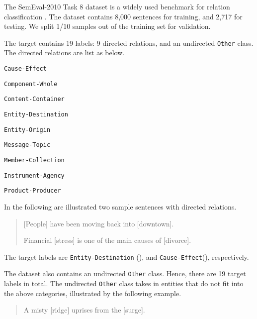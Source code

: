 \documentclass[11pt,a4paper]{article}
\begin{document}
The SemEval-2010 Task 8 dataset is a widely used benchmark for
relation classification \cite{2010SVM}. The dataset contains 8,000 sentences for training, and 2,717 for testing.
We split 1/10 samples out of the training set for validation.

The target contains 19 labels: 9 directed relations, and an undirected \verb|Other| class.
The directed relations are list as below.


\smallskip
\begin{compactitem}
\item \verb|Cause-Effect|

\item \verb|Component-Whole|

\item \verb|Content-Container|

\item \verb|Entity-Destination|

\item \verb|Entity-Origin|

\item \verb|Message-Topic|

\item \verb|Member-Collection|

\item \verb|Instrument-Agency|

\item \verb|Product-Producer|
\end{compactitem}

\smallskip
In the following are illustrated two sample sentences with directed relations.

\begin{quote}
[People] have been moving back into [downtown].

Financial [stress] is one of the main causes of [divorce].

\end{quote}
The target labels are \verb|Entity-Destination| (),
and \verb|Cause-Effect|(), respectively.

The dataset also contains an undirected \verb|Other| class.
Hence, there are 19 target labels in total.
The undirected \verb|Other| class takes in entities that do not
fit into the above categories, illustrated by the following example.


\begin{quote}
A misty [ridge] uprises from the [surge].
\end{quote}
\end{document}
